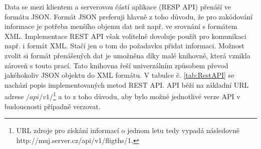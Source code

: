 \documentclass[ing,male,java,dept460]{diploma}						%
\begin{document}
Data se mezi klientem a serverovou částí aplikace (RESP API) přenáší ve formátu JSON. Formát JSON preferuji hlavně z toho důvodu, že pro zakódování informace je potřeba menšího objemu dat než např. ve srovnání s formátem XML. Implementace REST API však volitelně dovoluje použít pro komunikaci např. i formát XML. Stačí jen o tom do požadavku přidat informaci. Možnost zvolit si formát přenášených dat je umožněna díky malé knihovně, která vznikla zároveň s touto prací. Tato knihovna řeší univerzálním způsobem převod jakéhokoliv JSON objektu do XML formátu. V tabulce č. \ref{tab:RestAPI} se nachází popis implementovaných metod REST API. API běží na základní URL adrese $/api/v1/$\footnote{URL zdroje pro získání informací o jednom letu tedy vypadá následovně http://muj.server.cz/api/v1/fligths/1.} a to z toho důvodu, aby bylo možné jednotlivé verze API v budoucnosti případně verzovat.
\end{document}
